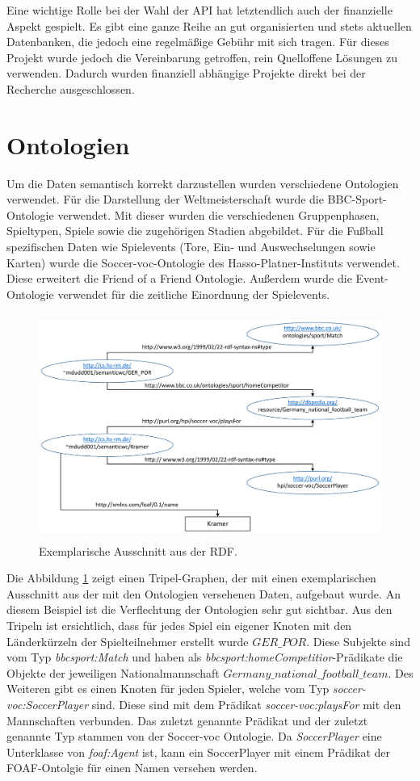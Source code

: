 \documentclass[runningheads,a4paper]{llncs}
\begin{document}
Eine wichtige Rolle bei der Wahl der API hat letztendlich auch der finanzielle Aspekt gespielt. Es gibt eine ganze Reihe an gut organisierten und stets aktuellen Datenbanken, die jedoch eine regelmäßige Gebühr mit sich tragen. Für dieses Projekt wurde jedoch die Vereinbarung getroffen, rein Quelloffene Lösungen zu verwenden. Dadurch wurden finanziell abhängige Projekte direkt bei der Recherche ausgeschlossen. 
  
\newpage
\section{Ontologien}
Um die Daten semantisch korrekt darzustellen wurden verschiedene Ontologien verwendet. Für die Darstellung der Weltmeisterschaft wurde die BBC-Sport-Ontologie verwendet. Mit dieser wurden die verschiedenen Gruppenphasen, Spieltypen, Spiele sowie die zugehörigen Stadien abgebildet. Für die Fußball spezifischen Daten wie Spielevents (Tore, Ein- und Auswechselungen sowie Karten) wurde die Soccer-voc-Ontologie des Hasso-Platner-Instituts verwendet. Diese erweitert die Friend of a Friend Ontologie. Außerdem wurde die Event-Ontologie verwendet für die zeitliche Einordnung der Spielevents.

\begin{figure}
\centering
\includegraphics[height=7.4cm]{graph_manus}
\caption{Exemplarische Ausschnitt aus der RDF.}
\label{fig:onto}
\end{figure}

Die Abbildung \ref{fig:onto} zeigt einen Tripel-Graphen, der mit einen exemplarischen Ausschnitt aus der mit den Ontologien versehenen Daten, aufgebaut wurde. An diesem Beispiel ist die Verflechtung der Ontologien sehr gut sichtbar.
Aus den Tripeln ist ersichtlich, dass für jedes Spiel ein eigener Knoten mit den Länderkürzeln der Spielteilnehmer erstellt wurde \(GER\_POR\). Diese Subjekte sind vom Typ \textit{bbcsport:Match} und haben als \textit{bbcsport:homeCompetitior}-Prädikate die Objekte der jeweiligen Nationalmannschaft \(Germany\_national\_football\_team\). 
Des Weiteren gibt es einen Knoten für jeden Spieler, welche vom Typ \textit{soccer-voc:SoccerPlayer} sind. Diese sind mit dem Prädikat \textit{soccer-voc:playsFor} mit den Mannschaften verbunden. Das zuletzt genannte Prädikat und der zuletzt genannte Typ stammen von der Soccer-voc Ontologie. Da \textit{SoccerPlayer} eine Unterklasse von \textit{foaf:Agent} ist, kann ein SoccerPlayer mit einem Prädikat der FOAF-Ontolgie für einen Namen versehen werden.
\newpage
\end{document}
